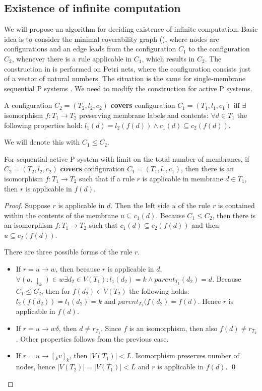\documentclass[llncs,submission,copyright,creativecommons]{../lib/lncs/llncs}
\begin{document}
\subsection{Existence of infinite computation} %
\label{sub:existence_of_infinite_computation}

We will propose an algorithm for deciding existence of infinite computation. Basic idea is to consider the minimal coverability graph (\cite{Rozenberg93MinimalCoverabilityGraph}), where nodes are configurations and an edge leads from the configuration $C_1$ to the configuration $C_2$, whenever there is a rule applicable in $C_1$, which results in $C_2$. The construction in \cite{Rozenberg93MinimalCoverabilityGraph} is performed on Petri nets, where the configuration consists just of a vector of natural numbers. The situation is the same for single-membrane sequential P systems \cite{Dal-Zilio03Dynamics}. We need to modify the construction for active P systems.

A configuration $C_2 = (T_2, l_2, c_2)$ {\bf covers} configuration $C_1 = (T_1, l_1, c_1)$ iff $\exists$ isomorphism $f: T_1\rightarrow T_2$ preserving membrane labels and contents: $\forall d\in T_1$ the following properties hold: $l_1(d)=l_2(f(d))\wedge c_1(d)\subseteq c_2(f(d))$.

We will denote this with $C_1\leq C_2$.

\begin{lemma}
\label{rule_applicability_lemma}
  For sequential active P system with limit on the total number of membranes, if $C_2 = (T_2, l_2, c_2)$ {\bf covers} configuration $C_1 = (T_1, l_1, c_1)$, then there is an isomorphism $f: T_1\rightarrow T_2$ such that if a rule $r$ is applicable in membrane $d\in T_1$, then $r$ is applicable in $f(d)$.
\end{lemma}

\begin{proof}
  Suppose $r$ is applicable in $d$. Then the left side $u$ of the rule $r$ is contained within the contents of the membrane $u\subseteq c_1(d)$. Because $C_1\leq C_2$, then there is an isomorphism $f:T_1\rightarrow T_2$ such that $c_1(d)\subseteq c_2(f(d))$ and then $u\subseteq c_2(f(d))$.

  There are three possible forms of the rule $r$.
  \begin{itemize}
    \item If $r = u\rightarrow w$, then because $r$ is applicable in $d$, $\forall (a,\downarrow_k)\in w \exists d_2\in V(T_1): l_1(d_2)=k \wedge parent_{T_1}(d_2) = d$. Because $C_1\leq C_2$, then for $f(d_2)\in V(T_2)$ the following holds: $l_2(f(d_2)) = l_1(d_2) = k$ and $parent_{T_2}(f(d_2) = f(d)$. Hence $r$ is applicable in $f(d)$.
    \item If $r = u\rightarrow w\delta$, then $d\neq r_{T_1}$. Since $f$ is an isomorphism, then also $f(d)\neq r_{T_2}$. Other properties follows from the previous case.
    \item If $r = u\rightarrow [_k v]_k$, then $|V(T_1)|<L$. Isomorphism preserves number of nodes, hence $|V(T_2)| = |V(T_1)| < L$ and $r$ is applicable in $f(d)$. \qed
  \end{itemize}
\end{proof}
\end{document}
